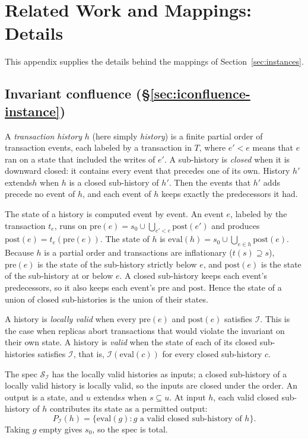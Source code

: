 \documentclass[sigconf]{cidr-2027}
\theoremstyle{remark}
\newcommand{\inrel}{extends\xspace}          %
\newcommand{\outrel}{extends\xspace}          %
\newcommand{\Spec}{\mathcal{S}}
\begin{document}
\section{Related Work and Mappings: Details}
\label{app:related}

This appendix supplies the details behind the mappings of Section~\ref{sec:instances}.

\subsection{Invariant confluence (\S\ref{sec:iconfluence-instance})}
\label{app:iconfluence}

A \emph{transaction history} $h$ (here simply \emph{history}) is a finite
partial order of transaction events, each labeled by a transaction in $T$,
where $e'<e$ means that $e$ ran on a state that included the writes of $e'$. A sub-history is \emph{closed} when it is downward closed: it contains every
event that precedes one of its own. History
$h'$ \inrel $h$ when $h$ is a closed sub-history of $h'$. Then the events
that $h'$ adds precede no event of $h$, and each event of $h$ keeps exactly
the predecessors it had.

The state of a history is computed event by event. An event $e$, labeled by
the transaction $t_e$, runs on
$\mathrm{pre}(e)=s_0\cup\bigcup_{e'<e}\mathrm{post}(e')$ and produces
$\mathrm{post}(e)=t_e(\mathrm{pre}(e))$. The state of $h$ is
$\mathrm{eval}(h)=s_0\cup\bigcup_{e\in h}\mathrm{post}(e)$. Because $h$ is a
partial order and transactions are inflationary ($t(s)\supseteq s$),
$\mathrm{pre}(e)$ is the state of the sub-history strictly below $e$, and
$\mathrm{post}(e)$ is the state of the sub-history at or below $e$. A
closed sub-history keeps each event's predecessors, so it also keeps each
event's $\mathrm{pre}$ and $\mathrm{post}$. Hence the state of a union of
closed sub-histories is the union of their states.

A history is \emph{locally valid} when every $\mathrm{pre}(e)$ and
$\mathrm{post}(e)$ satisfies $\mathcal I$. This is the case when replicas
abort transactions that would violate the invariant on their own state. A
history is \emph{valid} when the state of each of its closed sub-histories
satisfies $\mathcal I$, that is, $\mathcal I(\mathrm{eval}(c))$ for every
closed sub-history $c$.

The spec $\Spec_{\mathcal I}$ has the locally valid histories as inputs;
a closed sub-history of a locally valid history is locally valid, so the
inputs are closed under the order. An output is a state, and $u$ \outrel $s$ when $s\subseteq u$. \textcolor{reviewed}{At input $h$,
each valid closed sub-history of $h$ contributes its state as a permitted
output:}
\[
  P_{\mathcal I}(h)=\{\mathrm{eval}(g):g\text{ a valid closed
  sub-history of }h\}.
\]
Taking $g$ empty gives $s_0$, so the spec is total.
\end{document}
